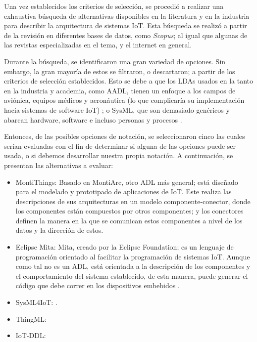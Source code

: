 Una vez establecidos los criterios de selección, se procedió a realizar una exhaustiva búsqueda de alternativas disponibles en la literatura y en la industria para describir la arquitectura de sistemas IoT. Esta búsqueda se realizó a partir de la revisión en diferentes bases de datos, como \textit{Scopus}; al igual que algunas de las revistas especializadas en el tema, y el internet en general.

Durante la búsqueda, se identificaron una gran variedad de opciones. Sin embargo, la gran mayoría de estos se filtraron, o descartaron; a partir de los criterios de selección establecidos. Esto se debe a que los LDAs usados en la tanto en la industria y academia, como AADL, tienen un enfoque a los campos de aviónica, equipos médicos y aeronáutica (lo que complicaría su implementación hacia sistemas de software IoT) \cite{aadl_web, aadl_pdf}; o SysML, que son demasiado genéricos y abarcan hardware, software e incluso personas y procesos \cite{omgsysml_2015}.

Entonces, de las posibles opciones de notación, se seleccionaron cinco las cuales serían evaluadas con el fin de determinar si alguna de las opciones puede ser usada, o si debemos desarrollar nuestra propia notación. A continuación, se presentan las alternativas a evaluar:

\begin{itemize}
    \item MontiThings: Basado en MontiArc, otro ADL más general; está diseñado para el modelado y prototipado de aplicaciones de IoT. Este realiza las descripciones de sus arquitecturas en un modelo componente-conector, donde los componentes están compuestos por otros componentes; y los conectores definen la manera en la que se comunican estos componentes a nivel de los datos y la dirección de estos. \cite{MontiThings, MontiThingsRepo}
    \item Eclipse Mita: Mita, creado por la Eclipse Foundation; es un lenguaje de programación orientado al facilitar la programación de sistemas IoT. Aunque como tal no es un ADL, está orientada a la descripción de los componentes y el comportamiento del sistema establecido, de esta manera, puede generar el código que debe correr en los dispositivos embebidos \cite{Mita}. 
    \item SysML4IoT:  \cite{SysML4IoT2016}.
    \item ThingML:
    \item IoT-DDL:
\end{itemize}

